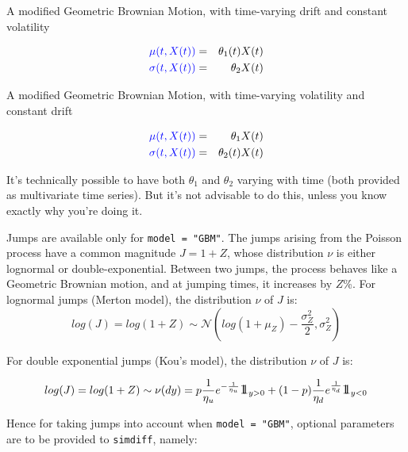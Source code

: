 \documentclass[a4paper]{article}\usepackage[]{graphicx}\usepackage[]{color}
\newcommand{\II}{\mbox{\large 1\hskip -0,353em 1}}
\newcommand{\code}[1]{\mbox{\texttt{#1}}}
\newcommand{\MN}{\mathcal{N}}
\begin{document}
\begin{itemize}
A modified Geometric Brownian Motion, with time-varying drift and constant volatility

\begin{eqnarray*}
\textcolor{blue}{\mu(t, X(t))} &=& \theta_1(t) X(t)\\
\textcolor{blue}{\sigma(t, X(t))} &=& \theta_2 X(t)\\
\end{eqnarray*}

A modified Geometric Brownian Motion, with time-varying volatility and constant drift

\begin{eqnarray*}
\textcolor{blue}{\mu(t, X(t))} &=& \theta_1 X(t)\\ 
\textcolor{blue}{\sigma(t, X(t))} &=& \theta_2(t) X(t)\\
\end{eqnarray*}
\end{itemize}

It's technically possible to have both $\theta_1$ and $\theta_2$ varying with time (both provided as multivariate time series). But it's not advisable to do this, unless you know exactly why you're doing it. 

\medskip

Jumps are available only for \code{model = "GBM"}. The jumps arising from the Poisson process have a common magnitude $J = 1+Z$, whose distribution $\nu$ is either lognormal or double-exponential. Between two jumps, the process behaves like a Geometric Brownian motion, and at jumping times, it increases by $Z$\%. For lognormal jumps (Merton model), the distribution $\nu$ of $J$ is:
\begin{equation}
log(J) = log(1+Z) \sim \MN(log(1+\mu_Z) - \frac{\sigma_Z^2}{2}, \sigma_Z^2)
\end{equation}

For double exponential jumps (Kou's model), the distribution $\nu$ of $J$ is:

\begin{equation}
log(J) = log(1+Z) \sim \nu(dy) = p\frac{1}{\eta_u} e^{- \frac{1}{\eta_u}} \II_{y > 0} + (1-p)\frac{1}{\eta_d} e^{\frac{1}{\eta_d}} \II_{y < 0}
\end{equation}

Hence for taking jumps into account when \code{model = "GBM"}, optional parameters are to be provided to \code{simdiff}, namely:
\end{document}
